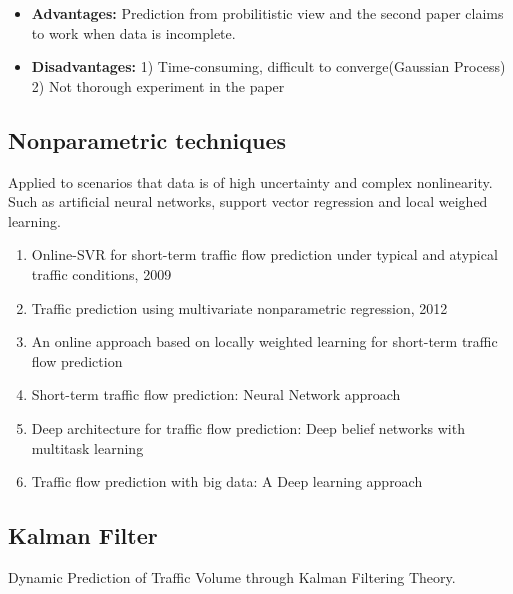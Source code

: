 \documentclass[11pt]{article}
\begin{document}
\begin{itemize}
	\item \textbf{Advantages:} Prediction from probilitistic view and the second paper claims to work when data is incomplete.
	
	\item \textbf{Disadvantages:} 1) Time-consuming, difficult to converge(Gaussian Process) 2) Not thorough experiment in the paper
\end{itemize}

\subsection{Nonparametric techniques} 
Applied to scenarios that data is of high uncertainty and complex nonlinearity. Such as artificial neural networks, support vector regression and local weighed learning.

\begin{enumerate}
	\item Online-SVR for short-term traffic flow prediction under typical and atypical traffic conditions, 2009
	\item Traffic prediction using multivariate nonparametric regression, 2012
	\item An online approach based on locally weighted learning for short-term traffic flow prediction
	\item Short-term traffic flow prediction: Neural Network approach
	\item Deep architecture for traffic flow prediction: Deep belief networks with multitask learning
	\item Traffic flow prediction with big data: A Deep learning approach
\end{enumerate}

\subsection{Kalman Filter}
Dynamic Prediction of Traffic Volume through Kalman Filtering Theory. 
\end{document}
